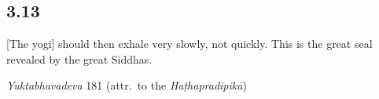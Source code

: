\begin{ekdosis}
\begin{philcomm}[hp03_012]

\end{philcomm}

\subsection*{3.13}
\begin{translation}[hp03_013]
{}[The yogi] should then exhale very slowly, not quickly. This is the great seal revealed by the great Siddhas.
\end{translation}


\begin{testimonia}[hp03_013]
\emph{Yuktabhavadeva} 181 (attr.~to the \emph{Haṭhapradīpikā})
\begin{versinnote}
\end{versinnote}
\end{testimonia}



\end{ekdosis}
